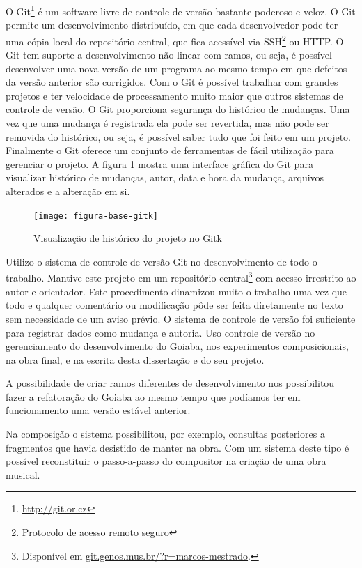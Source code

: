 O Git\footnote{\url{http://git.or.cz}} é um software livre de controle
de versão bastante poderoso e veloz. O Git permite um desenvolvimento
distribuído, em que cada desenvolvedor pode ter uma cópia local do
repositório central, que fica acessível via SSH\footnote{Protocolo de
  acesso remoto seguro} ou HTTP. O Git tem suporte a desenvolvimento
não-linear com ramos, ou seja, é possível desenvolver uma nova versão
de um programa ao mesmo tempo em que defeitos da versão anterior são
corrigidos. Com o Git é possível trabalhar com grandes projetos e ter
velocidade de processamento muito maior que outros sistemas de
controle de versão. O Git proporciona segurança do histórico de
mudanças. Uma vez que uma mudança é registrada ela pode ser revertida,
mas não pode ser removida do histórico, ou seja, é possível saber tudo
que foi feito em um projeto. Finalmente o Git oferece um conjunto de
ferramentas de fácil utilização para gerenciar o projeto. A figura
\ref{fig:historico-git} mostra uma interface gráfica do Git para
visualizar histórico de mudanças, autor, data e hora da mudança,
arquivos alterados e a alteração em si.

\begin{figure}
  \centering
  \texttt{[image: figura-base-gitk]}
  \caption{Visualização de histórico do projeto no Gitk}
  \label{fig:historico-git}
\end{figure}

Utilizo o sistema de controle de versão Git no desenvolvimento de todo
o trabalho. Mantive este projeto em um repositório
central\footnote{Disponível em
  \url{git.genos.mus.br/?r=marcos-mestrado}.} com acesso irrestrito ao
autor e orientador. Este procedimento dinamizou muito o trabalho uma
vez que todo e qualquer comentário ou modificação pôde ser feita
diretamente no texto sem necessidade de um aviso prévio. O sistema de
controle de versão foi suficiente para registrar dados como mudança e
autoria. Uso controle de versão no gerenciamento do desenvolvimento do
Goiaba, nos experimentos composicionais, na obra final, e na escrita
desta dissertação e do seu projeto.

A possibilidade de criar ramos diferentes de desenvolvimento nos
possibilitou fazer a refatoração do Goiaba ao mesmo tempo que podíamos
ter em funcionamento uma versão estável anterior.

Na composição o sistema possibilitou, por exemplo, consultas
posteriores a fragmentos que havia desistido de manter na obra. Com um
sistema deste tipo é possível reconstituir o passo-a-passo do
compositor na criação de uma obra musical.


